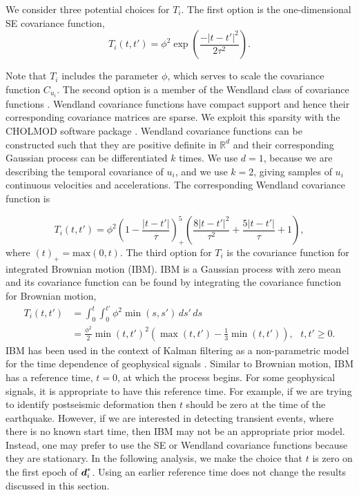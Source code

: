 \documentclass[extra,mreferee]{gji}
\begin{document}

We consider three potential choices for $T_i$. The first option is the
one-dimensional SE covariance function,
\begin{equation}\label{eq:TimeSE}
T_i(t,t') = \phi^2\exp\left(\frac{-|t - t'|^2}{2\tau^2}\right).
\end{equation}

Note that $T_i$ includes the parameter $\phi$, which serves to scale
the covariance function $C_{u_i}$. The second option is a member of
the Wendland class of covariance functions \citep{Wendland2005}.
Wendland covariance functions have compact support and hence their
corresponding covariance matrices are sparse. We exploit this sparsity
with the CHOLMOD software package \citep{Chen2008}. Wendland
covariance functions can be constructed such that they are positive
definite in $\mathbb{R}^d$ and their corresponding Gaussian process
can be differentiated $k$ times. We use $d=1$, because we are
describing the temporal covariance of $u_i$, and we use $k=2$, giving
samples of $u_i$ continuous velocities and accelerations. The
corresponding Wendland covariance function is

\begin{equation}\label{eq:Wendland} 
T_i(t,t') = \phi^2\left(1 - \frac{|t - t'|}{\tau}\right)^5_+ 
            \left(\frac{8|t - t'|^2}{\tau^2} + \frac{5|t - t'|}{\tau} + 1\right), 
\end{equation} 
where $(t)_+ = \mathrm{max}(0,t)$. The third option for $T_i$ is the
covariance function for integrated Brownian motion (IBM). IBM is a
Gaussian process with zero mean and its covariance function can be
found by integrating the covariance function for Brownian motion,
\begin{align}\label{eq:IBM}
T_i(t,t') &= \int_0^t \int_0^{t'} \phi^2 \min(s,s') \,ds'\,ds \\
          &= \frac{\phi^2}{2}\min(t,t')^2 \left(\max(t,t') - \frac{1}{3}\min(t,t')\right), \ \ \ t,t' \geq 0.
\end{align}
IBM has been used in the context of Kalman filtering as a
non-parametric model for the time dependence of geophysical signals
\citep[e.g.,][]{Segall1997, McGuire2003, Ohtani2010, Hines2016a}.
Similar to Brownian motion, IBM has a reference time, $t=0$, at which
the process begins. For some geophysical signals, it is appropriate to
have this reference time. For example, if we are trying to identify
postseismic deformation then $t$ should be zero at the time of the
earthquake.  However, if we are interested in detecting transient
events, where there is no known start time, then IBM may not be an
appropriate prior model. Instead, one may prefer to use the SE or
Wendland covariance functions because they are stationary. In the
following analysis, we make the choice that $t$ is zero on the first
epoch of $\data_i^*$. Using an earlier reference time does not change
the results discussed in this section.
\end{document}
